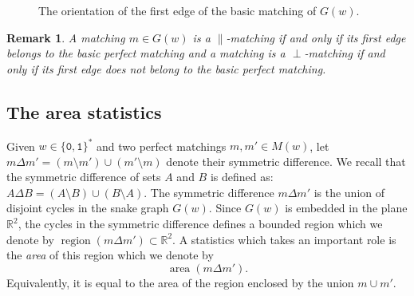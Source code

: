 \documentclass[a4paper,12pt]{amsart}
\newtheorem{remark}[definition]{Remark}
\newcommand{\R}{\mathbb{R}}
\newcommand{\0}{\mathtt{0}}
\newcommand{\1}{\mathtt{1}}
\newcommand{\2}{\mathtt{2}}
\newcommand{\3}{\mathtt{3}}
\newcommand{\carreplein}{{\perp}}
\newcommand{\carrevide}{{\parallel}}
\DeclareMathOperator{\region}{region}
\DeclareMathOperator{\area}{area}
\def\enclosedAreaColor{green!10}
\begin{document}
\begin{figure}[h]
\begin{center}
    \def\endX{6}
    \def\endY{3}
    \def\thesetup{
        \fill[\enclosedAreaColor] (0,0) -- (1,0) -- (\endX,\endY-1) -- (\endX,\endY) -- (\endX-1,\endY) -- (0,1) -- cycle;
        \draw[thebasicmatching] (\endX,\endY) to ++ (0,-1);
        \draw[thick,->,>=latex] (.5,.5) -- node[above] {$w$} (\endX-.5,\endY-.5);
        \foreach \p in {(0,0), (1,0), (0,1), (\endX,\endY-1), (\endX,\endY), (\endX-1,\endY)}
            \node[circled node] at \p {};
    }
\end{center}
    \caption{The orientation of the first edge of the basic matching of $G(w)$.}
    \label{fig:parity-of-w}
\end{figure}

\begin{remark}\label{rem:parallel-perp-interpretation}
A matching $m\in G(w)$ is a \emph{$\carrevide$-matching} if and only if its
    first edge belongs to the basic perfect matching
and a matching is a \emph{$\carreplein$-matching} if and only if its first edge does not
belong to the basic perfect matching.
\end{remark}

\subsection*{The area statistics}
Given $w\in\{\0,\1\}^*$ and two perfect matchings $m,m'\in M(w)$,
let $m\Delta m'=(m\setminus m')\cup(m'\setminus m)$ denote their symmetric difference.
We recall that the symmetric difference of sets $A$ and $B$
is defined as: $A\Delta B=(A\setminus B)\cup(B\setminus A)$.
The symmetric difference $m\Delta m'$ is the union of disjoint cycles
in the snake graph $G(w)$.
Since $G(w)$ is embedded in the plane $\R^2$,
the cycles in the symmetric difference defines a bounded region which
we denote by
$
    \region(m\Delta m')\subset\R^2.
$
A statistics which takes an important role is the
\emph{area} of this region which we denote by
\[
    \area(m\Delta m').
\]
Equivalently, it is equal to the area of the region enclosed
by the union $m\cup m'$.
\end{document}
